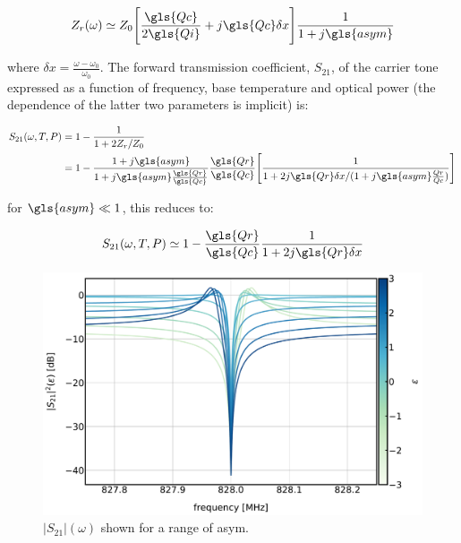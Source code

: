 \begin{equation}
  Z_{r}(\omega) \simeq Z_{0}\Bigg[ \frac{\gls{Qc}}{2\gls{Qi}} + j\gls{Qc}\delta x \Bigg] \frac{1}{1 + j\gls{asym}}
\end{equation}

where $\delta x = \frac{\omega - \omega_{0}}{\omega_{0}}$. The forward transmission coefficient, $S_{21}$, of the carrier tone expressed as a function of frequency, base temperature and optical power (the dependence of the latter two parameters is implicit) is:

\begin{equation}\label{eq:S21_Z}
  \begin{aligned}
  S_{21}(\omega, T, P) &= 1 - \frac{1}{1 + 2Z_{r}/Z_{0}} \\
                 &= 1 - \frac{1 + j\gls{asym}}{1 + j\gls{asym} \frac{\gls{Qr}}{\gls{Qc}}}\frac{\gls{Qr}}{\gls{Qc}}\Bigg[ \frac{1}{1 + 2j\gls{Qr}\delta x / ( 1 + j\gls{asym}\frac{Qr}{Qc}) }  \Bigg]
  \end{aligned}
\end{equation}

for $\gls{asym} \ll 1$, this reduces to:

\begin{equation}\label{eq:S21}
  S_{21}(\omega, T, P) \simeq 1 - \frac{\gls{Qr}}{\gls{Qc}}\frac{1}{1 + 2j\gls{Qr}\delta x}
\end{equation}

\begin{figure}[!htbp]
  \centering
  \includegraphics[width=\textwidth]{figures/kid_model/S21_eps}
  \caption[~ for a range of asymmetry parameters.]{$\left| S_{21} \right|(\omega)$ shown for a range of \gls{asym}.}
  \label{fig:S21_eps}
\end{figure}

